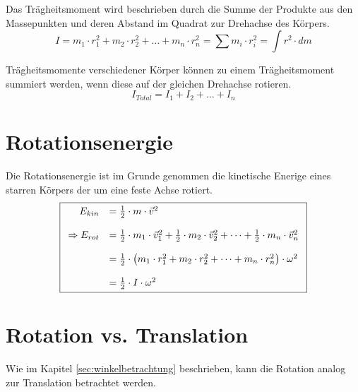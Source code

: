 Das Trägheitsmoment wird beschrieben durch die Summe der 
Produkte aus den Massepunkten und deren Abstand im Quadrat zur 
Drehachse des Körpers.
\[ \boxed{
	I = m_1 \cdot r_1^2
		+ m_2 \cdot r_2^2 
		+ \dots 
		+ m_n \cdot r_n^2
		= \sum m_i \cdot r_i^2
		= \int r^2 \cdot dm
} \]

\noindent
Trägheitsmomente verschiedener Körper können zu einem Trägheitsmoment
summiert werden, wenn diese auf der gleichen Drehachse rotieren.
\[ \boxed{
	I_{Total} = I_1 + I_2 + \dots + I_n
} \]

\section{Rotationsenergie}
Die Rotationsenergie ist im Grunde genommen die kinetische Enerige
eines starren Körpers der um eine feste Achse rotiert.
\[ \boxed{\begin{array}{r l}
	E_{kin} & = \frac{1}{2} \cdot m \cdot \vec{v}^2 \\
	& \\
	\Rightarrow E_{rot} & = \frac{1}{2} \cdot m_1 \cdot \vec{v}_1^2
			+ \frac{1}{2} \cdot m_2 \cdot \vec{v}_2^2
			+ \dots 
			+ \frac{1}{2} \cdot m_n \cdot \vec{v}_n^2 \\
	& \\
		& = \frac{1}{2} \cdot \left(m_1 \cdot r_1^2
			+ m_2 \cdot r_2^2 
			+ \dots
			+ m_n \cdot r_n^2\right) \cdot \omega^2 \\
	& \\
		& = \frac{1}{2} \cdot I \cdot \omega^2 
\end{array} } \]

\newpage
\section{Rotation vs. Translation}
Wie im Kapitel \ref{sec:winkelbetrachtung} beschrieben, kann die 
Rotation analog zur Translation betrachtet werden.

